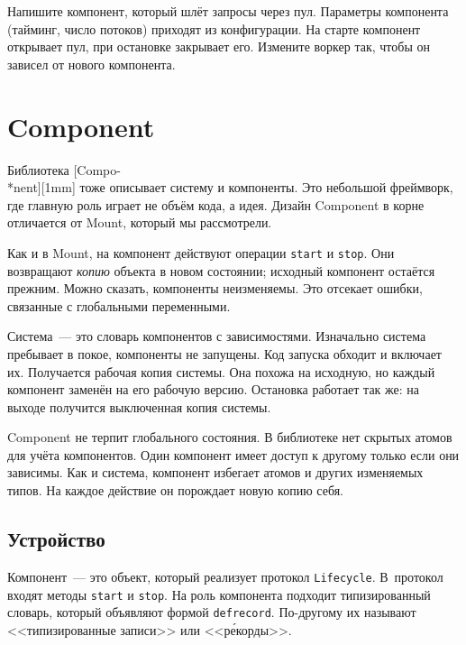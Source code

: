 \fi


Напишите компонент, который шлёт запросы через пул. Параметры компонента
(тайминг, число потоков) приходят из конфигурации. На старте компонент открывает
пул, при остановке закрывает его. Измените воркер так, чтобы он зависел от
нового компонента.

\section{Component}


Библиотека [Compo-\\*nent][1mm] тоже
описывает систему и компоненты. Это небольшой фреймворк, где главную роль играет
не объём кода, а идея. Дизайн Component в корне отличается от Mount, который мы
рассмотрели.


Как и в Mount, на компонент действуют операции \verb|start| и
\verb|stop|. Они возвращают \emph{копию} объекта в новом состоянии; исходный
компонент остаётся прежним. Можно сказать, компоненты неизменяемы. Это отсекает
ошибки, связанные с глобальными переменными.

Система~--- это словарь компонентов с зависимостями. Изначально система пребывает в
покое, компоненты не запущены. Код запуска обходит и включает их. Получается
рабочая копия системы. Она похожа на исходную, но каждый компонент заменён на
его рабочую версию. Остановка работает так же: на выходе получится выключенная
копия системы.

Component не терпит глобального состояния. В библиотеке нет скрытых атомов для
учёта компонентов. Один компонент имеет доступ к другому только если они
зависимы. Как и система, компонент избегает атомов и других изменяемых типов. На
каждое действие он порождает новую копию себя.

\subsection{Устройство}

\label{defrecord}

Компонент~--- это объект, который реализует протокол \verb|Lifecycle|. В~протокол
входят методы \verb|start| и \verb|stop|. На роль компонента подходит
типизированный словарь, который объявляют формой \verb|defrecord|. По-другому их
называют <<типизированные записи>> или <<р\'{е}корды>>.

